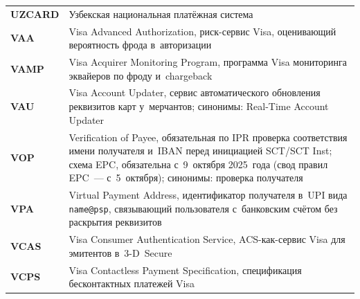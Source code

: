 \begin{longtable}{@{}p{4.5em}p{\dimexpr\linewidth-4.5em-2\tabcolsep\relax}@{}}
  \textbf{UZCARD}            & Узбекская национальная платёжная система                                                                                                                                                                                                                                                         \\
  \textbf{VAA}               & Visa Advanced Authorization, риск-сервис Visa, оценивающий вероятность фрода в~авторизации                                                                                                                                                                                                       \\
  \textbf{VAMP}              & Visa Acquirer Monitoring Program, программа Visa мониторинга эквайеров по фроду и~chargeback                                                                                                                                                                                                     \\
  \textbf{VAU}               & Visa Account Updater, сервис автоматического обновления реквизитов карт у~мерчантов; синонимы: Real-Time Account Updater                                                                                                                                                                         \\
  \textbf{VOP}               & Verification of Payee, обязательная по IPR проверка соответствия имени получателя и~IBAN перед инициацией SCT/SCT Inst; схема EPC, обязательна с~9~октября 2025~года (свод правил EPC~--- с~5~октября); синонимы: проверка получателя                                                                                                \\
  \textbf{VPA}               & Virtual Payment Address, идентификатор получателя в~UPI вида \texttt{name@psp}, связывающий пользователя с~банковским счётом без раскрытия реквизитов                                                                                                                                            \\
  \textbf{VCAS}              & Visa Consumer Authentication Service, ACS-как-сервис Visa для эмитентов в~3-D~Secure                                                                                                                                                                                                             \\
  \textbf{VCPS}              & Visa Contactless Payment Specification, спецификация бесконтактных платежей Visa                                                                                                                                                                                                                 \\

\end{longtable}
